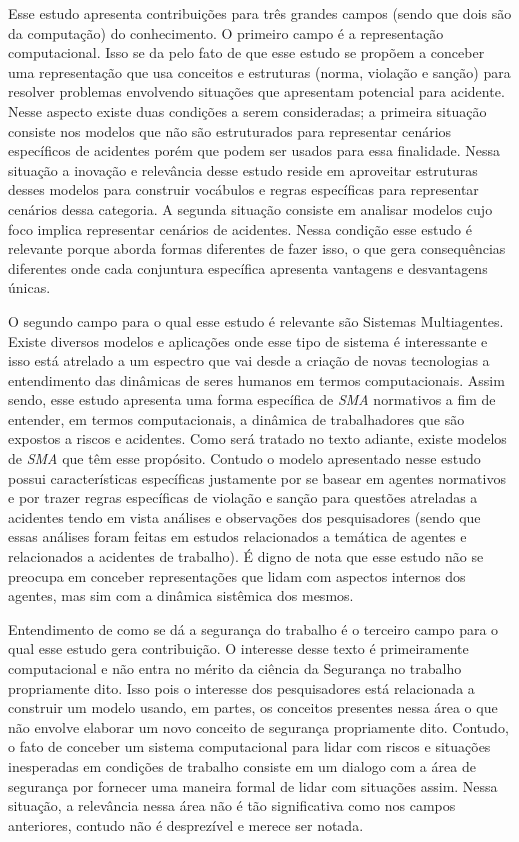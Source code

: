 Esse estudo apresenta contribuições para três grandes campos (sendo que dois são da computação) do conhecimento. O primeiro campo é a representação computacional. Isso se da pelo fato de que esse estudo se propõem a conceber uma representação que usa conceitos e estruturas (norma, violação e sanção) para resolver problemas envolvendo situações que apresentam potencial para acidente. Nesse aspecto existe duas condições a serem consideradas; a primeira situação consiste nos modelos que não são estruturados para representar cenários específicos de acidentes porém que podem ser usados para essa finalidade. Nessa situação a inovação e relevância desse estudo reside em aproveitar estruturas desses modelos para construir vocábulos e regras específicas para representar cenários dessa categoria. A segunda situação consiste em analisar modelos cujo foco implica representar cenários de acidentes. Nessa condição esse estudo é relevante porque aborda formas diferentes de fazer isso, o que gera consequências diferentes onde cada conjuntura específica apresenta vantagens e desvantagens únicas.    

O segundo campo para o qual esse estudo é relevante são Sistemas Multiagentes. Existe diversos modelos e aplicações onde esse tipo de sistema é interessante e isso está atrelado a um espectro que vai desde a criação de novas tecnologias a entendimento das dinâmicas de seres humanos em termos computacionais. Assim sendo, esse estudo apresenta uma forma específica de \textit{SMA} normativos a fim de entender, em termos computacionais, a dinâmica de trabalhadores que são expostos a riscos e acidentes. Como será tratado no texto adiante, existe modelos de \textit{SMA} que têm esse propósito. Contudo o modelo apresentado nesse estudo possui características específicas justamente por se basear em agentes normativos e por trazer regras específicas de violação e sanção para questões atreladas a acidentes tendo em vista análises e observações dos pesquisadores (sendo que essas análises foram feitas em estudos relacionados a temática de agentes e relacionados a acidentes de trabalho). É digno de nota que esse estudo não se preocupa em conceber representações que lidam com aspectos internos dos agentes, mas sim com a dinâmica sistêmica dos mesmos.

Entendimento de como se dá a segurança do trabalho é o terceiro campo para o qual esse estudo gera contribuição. O interesse desse texto é primeiramente computacional e não entra no mérito da ciência da Segurança no trabalho propriamente dito. Isso pois o interesse dos pesquisadores está relacionada a construir um modelo usando, em partes, os conceitos presentes nessa área o que não envolve elaborar um novo conceito de segurança propriamente dito. Contudo, o fato de conceber um sistema computacional para lidar com riscos e situações inesperadas em condições de trabalho consiste em um dialogo com a área de segurança por fornecer uma maneira formal de lidar com situações assim. Nessa situação, a relevância nessa área não é tão significativa como nos campos anteriores, contudo não é desprezível e merece ser notada.